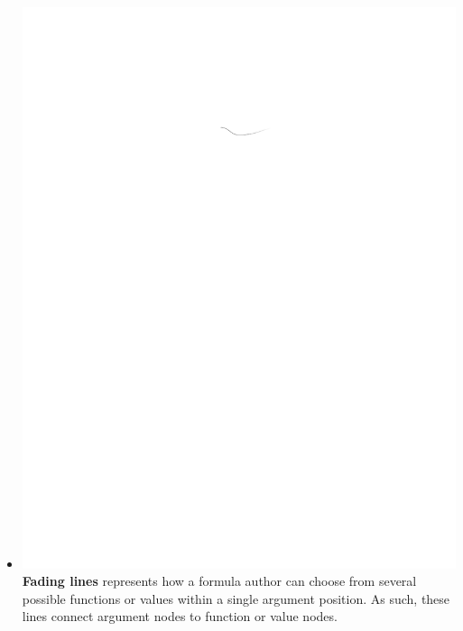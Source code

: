 \documentclass[conference]{IEEEtran}
\begin{document}
\begin{itemize}
		\item  \vspace{.25cm} \includegraphics{glossary-fadingline} \textbf{Fading
			lines} represents how a formula author can choose from several possible
		functions or values within a single argument position. As such, these lines
		connect argument nodes to function or value nodes.
		

\end{itemize}
\end{document}
